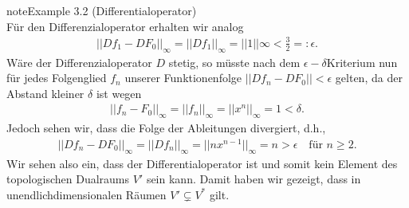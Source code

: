 \documentclass[letterpaper,10pt,german]{jupyterBook}
\begin{document}
\begin{sphinxadmonition}{note}{Example 3.2 (Differentialoperator)}
\begin{equation*}
\end{equation*}
\sphinxAtStartPar
Für den Differenzialoperator erhalten wir analog
\begin{equation*}
\begin{split}||Df_1 - DF_0||_\infty = ||Df_1||_\infty = ||1||\infty < \frac{3}{2} =: \epsilon.\end{split}
\end{equation*}
\sphinxAtStartPar
Wäre der Differenzialoperator \(D\) stetig, so müsste nach dem \(\epsilon-\delta\)\sphinxhyphen{}Kriterium nun für jedes Folgenglied \(f_n\) unserer Funktionenfolge \(||Df_n - DF_0|| < \epsilon\) gelten, da der Abstand kleiner \(\delta\) ist wegen
\begin{equation*}
\begin{split}||f_n - F_0||_\infty = ||f_n||_\infty = ||x^n||_\infty = 1 < \delta.\end{split}
\end{equation*}
\sphinxAtStartPar
Jedoch sehen wir, dass die Folge der Ableitungen divergiert, d.h.,
\begin{equation*}
\begin{split}||Df_n - DF_0||_\infty = ||Df_n||_\infty = ||nx^{n-1}||_\infty = n > \epsilon \quad \text{für } n\geq 2.\end{split}
\end{equation*}
\sphinxAtStartPar
Wir sehen also ein, dass der Differentialoperator  ist und somit kein Element des topologischen Dualraums \(V'\) sein kann.
Damit haben wir gezeigt, dass in unendlich\sphinxhyphen{}dimensionalen Räumen \(V' \subsetneq V^\ast\) gilt.
\end{sphinxadmonition}
\end{document}
